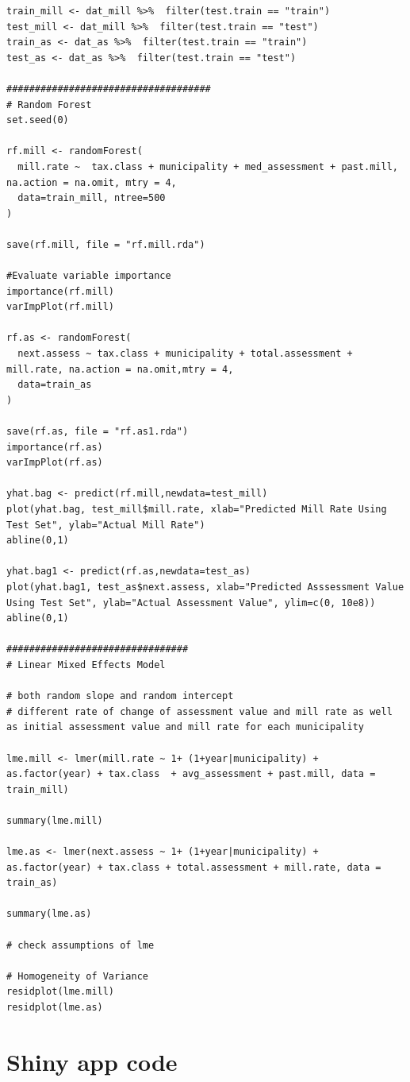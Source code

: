 \documentclass{article}
\begin{document}
\begin{lstlisting}[style=R, caption={Code used for the modeling.}, captionpos=b]
train_mill <- dat_mill %>%  filter(test.train == "train")
test_mill <- dat_mill %>%  filter(test.train == "test")
train_as <- dat_as %>%  filter(test.train == "train")
test_as <- dat_as %>%  filter(test.train == "test")

####################################
# Random Forest
set.seed(0)

rf.mill <- randomForest(
  mill.rate ~  tax.class + municipality + med_assessment + past.mill, na.action = na.omit, mtry = 4,
  data=train_mill, ntree=500
)

save(rf.mill, file = "rf.mill.rda")

#Evaluate variable importance
importance(rf.mill)
varImpPlot(rf.mill)

rf.as <- randomForest(
  next.assess ~ tax.class + municipality + total.assessment + mill.rate, na.action = na.omit,mtry = 4,
  data=train_as
)

save(rf.as, file = "rf.as1.rda")
importance(rf.as)
varImpPlot(rf.as)

yhat.bag <- predict(rf.mill,newdata=test_mill)
plot(yhat.bag, test_mill$mill.rate, xlab="Predicted Mill Rate Using Test Set", ylab="Actual Mill Rate")
abline(0,1)

yhat.bag1 <- predict(rf.as,newdata=test_as)
plot(yhat.bag1, test_as$next.assess, xlab="Predicted Asssessment Value Using Test Set", ylab="Actual Assessment Value", ylim=c(0, 10e8))
abline(0,1)

################################
# Linear Mixed Effects Model

# both random slope and random intercept
# different rate of change of assessment value and mill rate as well as initial assessment value and mill rate for each municipality 

lme.mill <- lmer(mill.rate ~ 1+ (1+year|municipality) + as.factor(year) + tax.class  + avg_assessment + past.mill, data = train_mill)

summary(lme.mill)

lme.as <- lmer(next.assess ~ 1+ (1+year|municipality) + as.factor(year) + tax.class + total.assessment + mill.rate, data = train_as)

summary(lme.as)

# check assumptions of lme

# Homogeneity of Variance
residplot(lme.mill)
residplot(lme.as)
\end{lstlisting}

\section{Shiny app code}
\end{document}
